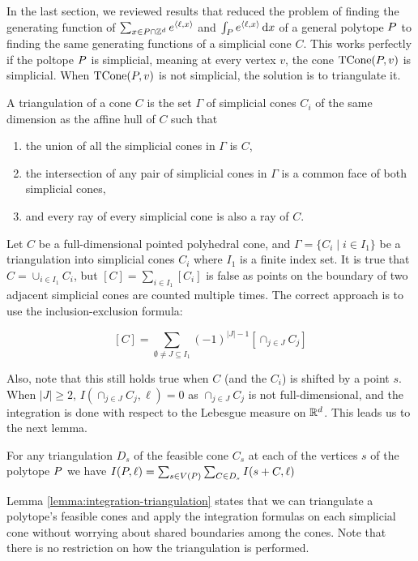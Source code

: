 In the last section, we reviewed results that reduced the problem of finding the generating function of $\sum_{x \in { P} \cap {\mathbb Z}^d } e^{{\langle} \ell, x {\rangle} }$ and $\int_{ P} e^{{\langle} \ell, x {\rangle}} \,\mathrm{d} x$ of a general polytope ${ P}$ to finding the same generating functions of a simplicial cone $C$. This works perfectly if the poltope ${ P}$ is simplicial, meaning at every vertex $v$, the cone $\operatorname{TCone}({ P}, v)$ is simplicial. When $\operatorname{TCone}({ P}, v)$ is not simplicial, the solution is to triangulate it.

\begin{definition}
A triangulation of a cone $C$ is the set $\Gamma$ of simplicial cones $C_i$ of the same dimension as the affine hull of $C$ such that
\begin{enumerate}
\item the union of all the simplicial cones in $\Gamma$ is $C$,
\item the intersection of any pair of simplicial cones in $\Gamma$ is a common face of both simplicial cones,
\item and every ray of every simplicial cone is also a ray of $C$.
\end{enumerate}
\end{definition}
  
 Let $C$ be a full-dimensional pointed polyhedral cone, and $\Gamma = \{ C_i \mid i \in I_1\}$ be a triangulation into simplicial cones $C_i$ where $I_1$ is a finite index set. It is true that $C = \cup_{i \in I_1} C_i$, but $[C] = \sum_{i \in I_1} [C_i]$ is false as points on the boundary of two adjacent simplicial cones are counted multiple times. The correct approach is to use the inclusion-exclusion formula:
 
 \[ [C] = \sum_{\emptyset \neq J \subseteq I_1} (-1)^{|J|-1} [\cap_{j \in J} C_j]\]

Also, note that this still holds true when $C$ (and the $C_i$) is shifted by a point $s$. When $|J| \geq 2$, $I(\cap_{j \in J} C_j, \ell) = 0$ as $\cap_{j \in J} C_j$ is not full-dimensional, and the integration is done with respect to the Lebesgue measure on ${\mathbb R}^d$. This leads us to the next lemma.

\begin{lemma}
\label{lemma:integration-triangulation}
For any triangulation $D_s$ of the feasible cone $C_s$ at each of the vertices $s$ of the polytope ${ P}$ we have $I({ P},\ell) = \sum_{s \in V({ P})} \sum_{C \in D_s} I(s+C,\ell)$
\end{lemma}

Lemma \ref{lemma:integration-triangulation} states that we can triangulate a polytope's feasible cones and apply the integration formulas on each simplicial cone without worrying about shared boundaries among the cones. Note that there is no restriction on how the triangulation is performed. 


